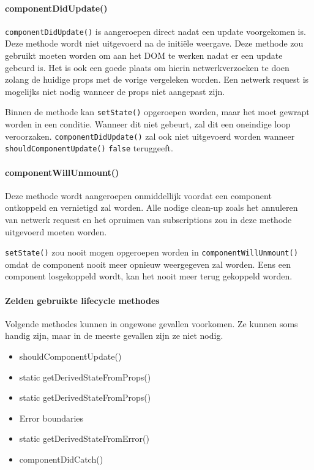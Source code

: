 \paragraph{componentDidUpdate()}

\texttt{componentDidUpdate()} is aangeroepen direct nadat een update voorgekomen is. Deze methode wordt niet uitgevoerd na de initiële weergave. Deze methode zou gebruikt moeten worden om aan het DOM te werken nadat er een update gebeurd is. Het is ook een goede plaats om hierin netwerkverzoeken te doen zolang de huidige props met de vorige vergeleken worden. Een netwerk request is mogelijks niet nodig wanneer de props niet aangepast zijn. \autocite{React2019d}

Binnen de methode kan \texttt{setState()} opgeroepen worden, maar het moet gewrapt worden in een conditie. Wanneer dit niet gebeurt, zal dit een oneindige loop veroorzaken. \texttt{componentDidUpdate()} zal ook niet uitgevoerd worden wanneer \texttt{shouldComponentUpdate()} \texttt{false} teruggeeft.  \autocite{React2019d}

\paragraph{componentWillUnmount()}

Deze methode wordt aangeroepen onmiddellijk voordat een component ontkoppeld en vernietigd zal worden. Alle nodige clean-up zoals het annuleren van netwerk request en het opruimen van subscriptions zou in deze methode uitgevoerd moeten worden.  \autocite{React2019d}

\texttt{setState()} zou nooit mogen opgeroepen worden in \texttt{componentWillUnmount()} omdat de component nooit meer opnieuw weergegeven zal worden. Eens een component losgekoppeld wordt, kan het nooit meer terug gekoppeld worden.  \autocite{React2019d}

\paragraph{Zelden gebruikte lifecycle methodes}

Volgende methodes kunnen in ongewone gevallen voorkomen. Ze kunnen soms handig zijn, maar in de meeste gevallen zijn ze niet nodig.  \autocite{React2019d}

\begin{itemize}
    \item shouldComponentUpdate()
    \item static getDerivedStateFromProps()
    \item static getDerivedStateFromProps()
    \item Error boundaries
    \item static getDerivedStateFromError()
    \item componentDidCatch()
\end{itemize}

